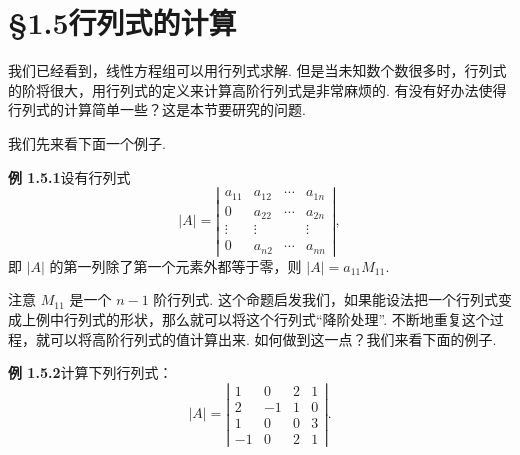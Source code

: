 \documentclass[UTF8, 12pt, fontset=fandol, oneside]{ctexart}
\begin{document}
\section*{§1.5\quad 行列式的计算}

我们已经看到，线性方程组可以用行列式求解. 但是当未知数个数很多时，行列式的阶将很大，用行列式的定义来计算高阶行列式是非常麻烦的. 有没有好办法使得行列式的计算简单一些？这是本节要研究的问题.

我们先来看下面一个例子.

\noindent\textbf{例 1.5.1}\quad 设有行列式
\[
|A|=
\left|\begin{array}{ccccc}
a_{11} & a_{12} & \cdots & a_{1n}\\
0 & a_{22} & \cdots & a_{2n}\\
\vdots & \vdots & & \vdots\\
0 & a_{n2} & \cdots & a_{nn}
\end{array}\right|,
\]
即 $|A|$ 的第一列除了第一个元素外都等于零，则 $|A|=a_{11}M_{11}$.

注意 $M_{11}$ 是一个 $n-1$ 阶行列式. 这个命题启发我们，如果能设法把一个行列式变成上例中行列式的形状，那么就可以将这个行列式“降阶处理”. 不断地重复这个过程，就可以将高阶行列式的值计算出来. 如何做到这一点？我们来看下面的例子.

\noindent\textbf{例 1.5.2}\quad 计算下列行列式：
\[
|A|=
\left|\begin{array}{cccc}
1 & 0 & 2 & 1\\
2 & -1 & 1 & 0\\
1 & 0 & 0 & 3\\
-1 & 0 & 2 & 1
\end{array}\right|.
\]
\end{document}
